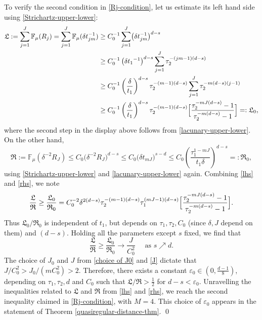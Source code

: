 \documentclass[a4paper,11pt]{amsart}
\numberwithin{equation}{section}
\begin{document}
To verify the second condition in \eqref{Rj-condition}, let us estimate its left hand side using \eqref{Strichartz-upper-lower}:  
\begin{align} 
\mathfrak L := \sum_{j=1}^{J} \mathbb F_{\mu}(R_j) = \sum_{j=1}^{J} \mathbb F_{\mu}(\delta t_{jm}^{-1}) &\geq C_0^{-1} \sum_{j=1}^{J} \bigl( \delta t_{jm}^{-1} \bigr)^{d-s} \nonumber \\ 
&\geq 
C_0^{-1} \left(\delta{t_1}^{-1} \right)^{d-s} \sum_{j=1}^{J} \tau_2^{-(jm-1)(d-s)} \nonumber \\
&  \geq C_0^{-1} \left(\frac{\delta}{t_1}\right)^{d-s} \tau_2^{-(m-1)(d-s)} \sum_{j=1}^{J} \tau_2^{-m(d-s)(j-1)} \nonumber \\ 
&\geq C_0^{-1} \left(\frac{\delta}{t_1}\right)^{d-s}\tau_2^{-(m-1)(d-s)} \Bigl[ \frac{\tau_2^{-mJ(d-s)}-1}{\tau_2^{-m(d-s)}-1} \Bigr] =: \mathfrak{L}_0, \label{lhs} 
\end{align}  
where the second step in the display above follows from \eqref{lacunary-upper-lower}. On the other hand, 
\begin{equation} 
\mathfrak R := \mathbb F_{\mu}(\delta^{-2} R_J) \leq C_0 \bigl(\delta^{-2} R_J \bigr)^{d-s} \leq C_0 \bigl(\delta t_{mJ} \bigr)^{s-d} \leq C_0 \left(\frac{\tau_1^{1-mJ}}{t_1 \delta} \right)^{d-s} =: \mathfrak{R}_0, \label{rhs}  \end{equation}  
using \eqref{Strichartz-upper-lower} and \eqref{lacunary-upper-lower} again. Combining \eqref{lhs} and \eqref{rhs}, we note
\[  \frac{\mathfrak L}{\mathfrak R} \geq \frac{\mathfrak L_0}{\mathfrak R_0} = C_0^{-2} \delta^{2(d-s)} \tau_2^{-(m-1)(d-s)} \tau_1^{(mJ-1)(d-s)} \Bigl[ \frac{\tau_2^{-mJ(d-s)}-1}{\tau_2^{-m(d-s)}-1} \Bigr]. \] 
Thus $\mathfrak L_0/\mathfrak R_0$ is independent of $t_1$, but depends on $\tau_1, \tau_2, C_0$ (since $\delta, J$ depend on them) and $(d-s)$. Holding all the parameters except $s$ fixed, we find that
\[ \frac{\mathfrak L}{\mathfrak R} \geq \frac{\mathfrak L_0}{\mathfrak R_0} \longrightarrow \frac{J}{C_0^2} \quad \text{ as } s \nearrow d.\] 
The choice of $J_0$ and $J$ from \eqref{choice of J0} and \eqref{J} dictate that $J/C_0^2 > J_0/(mC_0^2) > 2$. Therefore, there exists a constant $\varepsilon_0 \in (0, \frac{d-1}{8})$, depending on $\tau_1, \tau_2, d$ and $C_0$ such that $\mathfrak L/\mathfrak R > \frac{1}{2}$ for $d-s < \varepsilon_0$. Unravelling the inequalities related to $\mathfrak L$ and $\mathfrak R$ from \eqref{lhs} and \eqref{rhs}, we reach the second inequality claimed in \eqref{Rj-condition}, with $M=4$. This choice of $\varepsilon_0$ appears in the statement of Theorem \ref{quasiregular-distance-thm}.  
\qed
\end{document}
